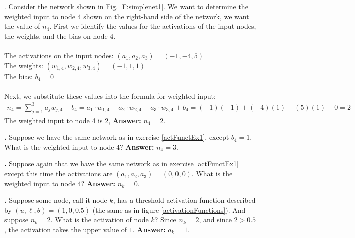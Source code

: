\noindent

\label{actFunctEx1}
\noindent
{\bf \theActFunctionCounter}. Consider the network shown in Fig. \ref{F:simplenet1}. We want to determine the weighted 
input to node 4 shown on the right-hand side of the network, \ie we want the
value of $n_4$. First we identify the values for the activations of the input 
nodes, the weights, and the bias on node 4. \\ \\
\indent \qquad\qquad The activations on the input nodes: $(a_1,a_2,a_3) = 
(-1,-4,5)$ \\
\indent \qquad\qquad The weights: $(w_{1,4}, w_{2,4}, w_{3,4}) = (-1,1,1)$ \\
\indent \qquad\qquad The bias: $b_4 = 0$ \\ \\
Next, we substitute these values into the formula for weighted input:
\begin{eqnarray*}
n_4 = \sum_{j=1}^{3}  a_j  w_{j,4} + b_4 
    =  a_1 \cdot w_{1,4} + a_2 \cdot w_{2,4} + a_3 \cdot w_{3,4} + b_4 
    =      (-1)(-1)      +      (-4)(1)      +       (5)(1)      + 0 
    = 2
\end{eqnarray*}
The weighted input to node 4 is $2$, {\bf Answer:} $n_4=2$.

\bigskip

\noindent

{\bf \theActFunctionCounter.} Suppose we have the same network as in exercise \ref{actFunctEx1}, except 
$b_4 = 1$. What is the weighted input to node 4? {\bf Answer:} $n_4=3$.

\bigskip

\noindent
{\bf \theActFunctionCounter.} Suppose again that we have the same network as in exercise \ref{actFunctEx1} except this time the activations are $(a_1,a_2,a_3) = (0,0,0)$. What is the 
weighted input to node 4? {\bf Answer:} $n_k=0$.

\bigskip

\noindent
{\bf \theActFunctionCounter.} Suppose some node, call it node $k$, has a threshold 
activation function described by $(u,\ell,\theta) = (1,0,0.5)$ (the same as in 
figure \ref{activationFunctions}). And suppose $n_k = 2$. What is the activation 
of node $k$?  Since $n_k = 2$, and since $2 > 0.5$, the activation takes the 
upper value of $1$. {\bf Answer:} $a_k=1$.

\bigskip

